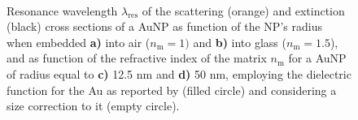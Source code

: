 \begin{figure}
    \hspace*{-18.75em}%
    \vspace*{-1.25em}%
        \begin{subfigure}{.375\textwidth}\caption{ }\label{sfig:red:1}\end{subfigure}%
        \begin{subfigure}{.25\textwidth}\caption{ }\label{sfig:red:2}\end{subfigure} \\
    \def\svgwidth{.9\textwidth}
    \centering
    \vspace*{0em}
    \caption[Spectral redshift of the scattering and extinction of a spherical AuNP as function of its size and the embedding media]{Resonance wavelength $\lambda_\text{res}$ of the scattering (orange) and extinction (black) cross sections of a AuNP as function of the NP's radius when embedded \textbf{a)} into air ($n_\text{m} = 1)$ and \textbf{b)} into glass ($n_\text{m} = 1.5$), and as function of the refractive index of the matrix  $n_\text{m}$ for a AuNP of radius equal to  \textbf{c)} 12.5 nm and \textbf{d)} 50 nm, employing the dielectric function for the Au as reported by \citeauthor{johnson_optical_1972} (filled circle) and considering a size correction to it (empty circle).}
\end{figure}

